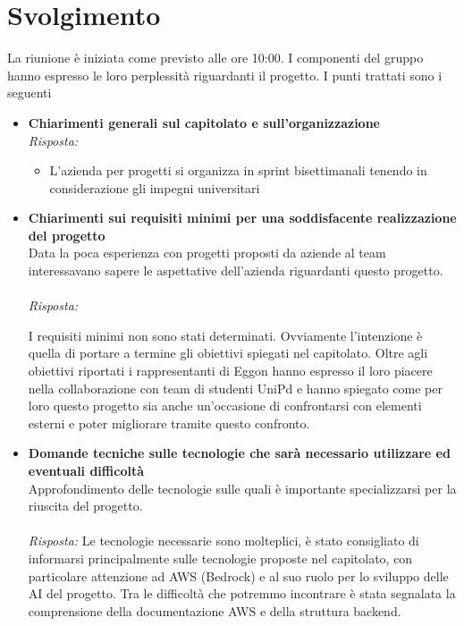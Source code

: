 \documentclass[a4paper,12pt]{article}
\begin{document}
\section{Svolgimento}
    La riunione è iniziata come previsto alle ore 10:00. I componenti del gruppo hanno espresso le loro perplessità riguardanti il progetto. I punti trattati sono i seguenti
    \begin{itemize}
    \item \textbf{Chiarimenti generali sul capitolato e sull'organizzazione}\\
    \noindent
    \textit{Risposta:} \\
    \begin{itemize}
        \item L'azienda per progetti si organizza in sprint bisettimanali tenendo in considerazione gli impegni universitari
    \end{itemize}
    
    \vspace{1em}

    \item \textbf{Chiarimenti sui requisiti minimi per una soddisfacente realizzazione del progetto}\\
    \noindent
    Data la poca esperienza con progetti proposti da aziende al team interessavano sapere le aspettative dell'azienda riguardanti questo progetto. 
    \\ \\
    \textit{Risposta:} 
    
    I requisiti minimi non sono stati determinati. Ovviamente l'intenzione è quella di portare a termine gli obiettivi spiegati nel capitolato. Oltre agli obiettivi riportati i rappresentanti di Eggon hanno espresso il loro piacere nella collaborazione con team di studenti UniPd e hanno spiegato come per loro questo progetto sia anche un'occasione di confrontarsi con elementi esterni e poter migliorare tramite questo confronto.
    
    \vspace{1em}

    \item \textbf{Domande tecniche sulle tecnologie che sarà necessario utilizzare ed eventuali difficoltà}\\
    \noindent
    Approfondimento delle tecnologie sulle quali è importante specializzarsi per la riuscita del progetto.\\ \\
    \textit{Risposta:} 
    Le tecnologie necessarie sono molteplici, è stato consigliato di informarsi principalmente sulle tecnologie proposte nel capitolato, con particolare attenzione ad AWS (Bedrock) e al suo ruolo per lo sviluppo delle AI del progetto. Tra le difficoltà che potremmo incontrare è stata segnalata la comprensione della documentazione AWS e della struttura backend.
    \vspace{1em}


\end{itemize}
\end{document}
